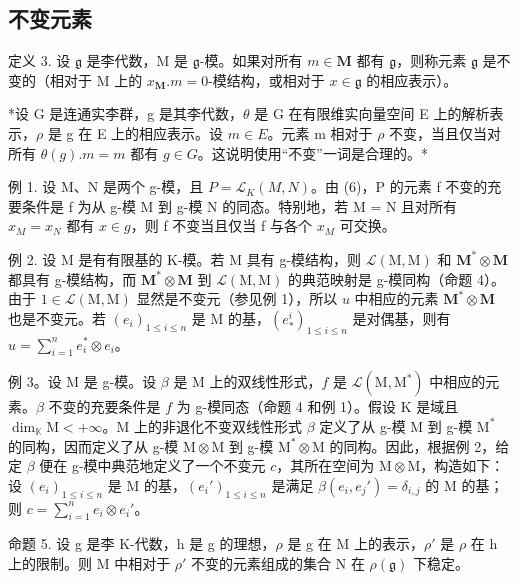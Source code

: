 \subsection{不变元素}

定义 3. 设 \(\mathfrak{g}\) 是李代数，M 是 \(\mathfrak{g}\)-模。如果对所有 \(m \in \mathbf{M}\) 都有 \(\mathfrak{g}\)，则称元素 \(\mathfrak{g}\) 是不变的（相对于 M 上的 \(x_{\mathbf{M}}.m = 0\)-模结构，或相对于 \(x \in \mathfrak{g}\) 的相应表示）。

*设 G 是连通实李群，g 是其李代数，\(\theta\) 是 G 在有限维实向量空间 E 上的解析表示，\(\rho\) 是 g 在 E 上的相应表示。设 \(m \in E\)。元素 m 相对于 \(\rho\) 不变，当且仅当对所有 \(\theta(g).m = m\) 都有 \(g \in G\)。这说明使用“不变”一词是合理的。*

例 1. 设 M、N 是两个 g-模，且 \(P = \mathcal{L}_{K}(M, N)\)。由 (6)，P 的元素 f 不变的充要条件是 f 为从 g-模 M 到 g-模 N 的同态。特别地，若 M = N 且对所有 \(x_{M} = x_{N}\) 都有 \(x \in g\)，则 f 不变当且仅当 f 与各个 \(x_{M}\) 可交换。

例 2. 设 M 是有有限基的 K-模。若 M 具有 g-模结构，则 \(\mathcal{L}(\mathrm{M},\mathrm{M})\) 和 \(\mathbf{M}^*\otimes \mathbf{M}\) 都具有 g-模结构，而 \(\mathbf{M}^{*}\otimes \mathbf{M}\) 到 \(\mathcal{L}(\mathrm{M},\mathrm{M})\) 的典范映射是 g-模同构（命题 4）。由于 \(1\in \mathcal{L}(\mathrm{M},\mathrm{M})\) 显然是不变元（参见例 1），所以 \(u\) 中相应的元素 \(\mathbf{M}^{*}\otimes \mathbf{M}\) 也是不变元。若 \((e_i)_{1\leq i\leq n}\) 是 M 的基，\((e_{*}^{i})_{1\leqslant i\leqslant n}\) 是对偶基，则有 \(u = \sum_{i = 1}^{n}e_{i}^{*}\otimes e_{i}\)。

例 3。设 M 是 g-模。设 \(\beta\) 是 M 上的双线性形式，\(f\) 是 \(\mathcal{L}(\mathrm{M},\mathrm{M}^*)\) 中相应的元素。\(\beta\) 不变的充要条件是 \(f\) 为 g-模同态（命题 4 和例 1）。假设 K 是域且 \(\dim_{\mathbb{K}}\mathrm{M} < +\infty\)。M 上的非退化不变双线性形式 \(\beta\) 定义了从 g-模 M 到 g-模 \(\mathrm{M}^*\) 的同构，因而定义了从 g-模 \(\mathrm{M}\otimes \mathrm{M}\) 到 g-模 \(\mathrm{M}^*\otimes \mathrm{M}\) 的同构。因此，根据例 2，给定 \(\beta\) 便在 g-模中典范地定义了一个不变元 \(c\)，其所在空间为 \(\mathrm{M}\otimes \mathrm{M}\)，构造如下：设 \((e_i)_{1\leqslant i\leqslant n}\) 是 M 的基，\((e_i')_{1\leqslant i\leqslant n}\) 是满足 \(\beta (e_i,e_j') = \delta_{i,j}\) 的 M 的基；则 \(c = \sum_{i=1}^{n}e_i\otimes e_i'\)。

命题 5. 设 g 是李 K-代数，h 是 g 的理想，\(\rho\) 是 g 在 M 上的表示，\(\rho'\) 是 \(\rho\) 在 h 上的限制。则 M 中相对于 \(\rho'\) 不变的元素组成的集合 N 在 \(\rho(\mathfrak{g})\) 下稳定。

